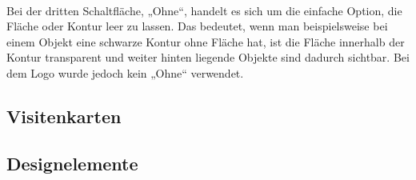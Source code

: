 \leavevmode \\
Bei der dritten Schaltfläche, „Ohne“, handelt es sich um die einfache Option, die Fläche oder Kontur leer zu lassen. Das bedeutet, wenn man beispielsweise bei einem Objekt eine schwarze Kontur ohne Fläche hat, ist die Fläche innerhalb der Kontur transparent und weiter hinten liegende Objekte sind dadurch sichtbar. Bei dem Logo wurde jedoch kein „Ohne“ verwendet.

\subsection{Visitenkarten}
\subsection{Designelemente}